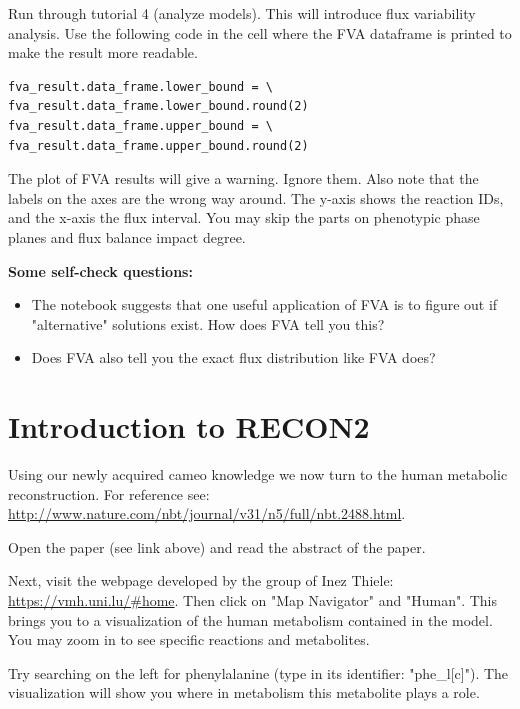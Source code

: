 \documentclass{article}
\begin{document}
\begin{tcolorbox}[width=\textwidth,colback={yellow},title={ASSIGNMENT},coltitle=white]

Run through tutorial 4 (analyze models). This will introduce flux variability analysis. Use the following code in the cell where the FVA dataframe is printed to make the result more readable.

\begin{verbatim}
fva_result.data_frame.lower_bound = \
fva_result.data_frame.lower_bound.round(2)
fva_result.data_frame.upper_bound = \
fva_result.data_frame.upper_bound.round(2)
\end{verbatim}

The plot of FVA results will give a warning. Ignore them. Also note that the labels on the axes are the wrong way around. The y-axis shows the reaction IDs, and the x-axis the flux interval. You may skip the parts on phenotypic phase planes and flux balance impact degree.

\textbf{Some self-check questions:}
\begin{itemize}
\item The notebook suggests that one useful application of FVA is to figure out if "alternative" solutions exist. How does FVA tell you this? 
\item Does FVA also tell you the exact flux distribution like FVA does?
\end{itemize}

\end{tcolorbox}

\section{Introduction to RECON2}
Using our newly acquired cameo knowledge we now turn to the human metabolic reconstruction. For reference see: \url{http://www.nature.com/nbt/journal/v31/n5/full/nbt.2488.html}.

\begin{tcolorbox}[width=\textwidth,colback={yellow},title={ASSIGNMENT},coltitle=white]

Open the paper (see link above) and read the abstract of the paper. \newline

Next, visit the webpage developed by the group of Inez Thiele: \url{https://vmh.uni.lu/#home}. Then click on "Map Navigator" and "Human". This brings you to a visualization of the human metabolism contained in the model. You may zoom in to see specific reactions and metabolites. \newline

Try searching on the left for phenylalanine (type in its identifier: "phe\_l[c]"). The visualization will show you where in metabolism this metabolite plays a role.
\end{tcolorbox}
\end{document}
